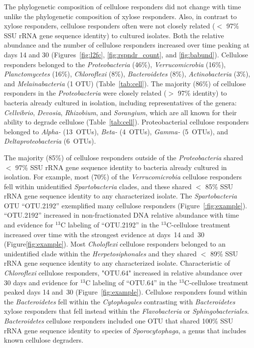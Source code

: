The phylogenetic composition of cellulose responders did not change with time
unlike the phylogenetic composition of xylose responders. Also, in contrast to
xylose responders, cellulose responders often were not closely related ($<$
97\% SSU rRNA gene sequence identity) to cultured isolates. Both the relative
abundance and the number of cellulose responders increased over time peaking at
days 14 and 30 (Figures~\ref{fig:l2fc}, \ref{fig:rspndr_count}, and
\ref{fig:babund}). Cellulose responders belonged to the \textit{Proteobacteria}
(46\%), \textit{Verrucomicrobia} (16\%), \textit{Planctomycetes} (16\%),
\textit{Chloroflexi} (8\%), \textit{Bacteroidetes} (8\%),
\textit{Actinobacteria} (3\%), and \textit{Melainabacteria} (1 OTU)
(Table~\ref{tab:cell}). The majority (86\%) of cellulose responders in the
\textit{Proteobacteria} were closely related ($>$ 97\% identity) to bacteria
already cultured in isolation, including representatives of the genera:
\textit{Cellvibrio}, \textit{Devosia}, \textit{Rhizobium}, and
\textit{Sorangium}, which are all known for their ability to degrade cellulose
(Table~\ref{tab:cell}). Proteobacterial cellulose responders belonged to
\textit{Alpha-} (13~OTUs), \textit{Beta-} (4~OTUs), \textit{Gamma-} (5~OTUs),
and \textit{Deltaproteobacteria} (6~OTUs). 

The majority (85\%) of cellulose responders outside of the
\textit{Proteobacteria} shared  $<$ 97\% SSU rRNA gene sequence identity to
bacteria already cultured in isolation. For example, most (70\%) of the
\textit{Verrucomicrobia} cellulose responders fell within unidentified
\textit{Spartobacteria} clades, and these shared $<$ 85\% SSU rRNA gene
sequence identity to any characterized isolate. The \textit{Spartobacteria} OTU
``OTU.2192'' exemplified many cellulose responders (Figure~\ref{:fig:example}).
``OTU.2192'' increased in non-fractionated DNA relative abundance
with time and evidence for $^{13}$C labeling of ``OTU.2192'' in the
$^{13}$C-cellulose treatment increased over time with the strongest evidence at
days~14 and~30 (Figure\ref{fig:example}). Most \textit{Choloflexi} cellulose
responders belonged to an unidentified clade within the
\textit{Herpetosiphonales} and they shared $<$ 89\% SSU rRNA gene sequence
identity to any characterized isolate. Characteristic of \textit{Chloroflexi}
cellulose responders, "OTU.64" increased in relative abundance over 30 days and
evidence for $^{13}$C labeling of ``OTU.64'' in the $^{13}$C-cellulose
treatment peaked days 14 and~30 (Figure~\ref{fig:example}). Cellulose
responders found within the \textit{Bacteroidetes} fell within the
\textit{Cytophagales} contrasting with \textit{Bacteroidetes} xylose responders
that fell instead within the \textit{Flavobacteria} or
\textit{Sphingobacteriales}. \textit{Bacteroidetes} cellulose responders
included one OTU that shared 100\% SSU rRNA gene sequence identity to species
of \textit{Sporocytophaga}, a genus that includes known cellulose degraders.

